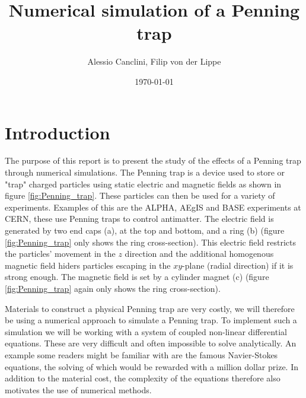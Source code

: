 \documentclass[english,notitlepage,reprint,nofootinbib]{revtex4-1}  %
\begin{document}
\title{Numerical simulation of a Penning trap}  %
\author{Alessio Canclini, Filip von der Lippe} %
\date{\today}                             %
\noaffiliation                            %

\begin{abstract}
\end{abstract}
\maketitle


\section{Introduction}
The purpose of this report is to present the study of the effects of a Penning trap through numerical simulations. The Penning trap is a device used to store or "trap" charged particles 
using static electric and magnetic fields as shown in figure \ref*{fig:Penning_trap}. These particles can then be used for a variety of experiments. Examples of this are the ALPHA, AEgIS and BASE 
experiments at CERN, these use Penning traps to control antimatter. 
The electric field is generated by two end caps (a), at the top and bottom, 
and a ring (b) (figure \ref*{fig:Penning_trap} only shows the ring cross-section).
This electric field restricts the particles' movement in the $z$ direction and the additional homogenous magnetic field 
hiders particles escaping in the $xy$-plane (radial direction) if it is strong enough. The magnetic field is set by 
a cylinder magnet (c) (figure \ref*{fig:Penning_trap} again only shows the ring cross-section). 

Materials to construct a physical Penning trap are very costly, we will therefore
be using a numerical approach to simulate a Penning trap. To implement such a simulation
we will be working with a system of coupled non-linear differential equations. These are very
difficult and often impossible to solve analytically. An example some readers might be familiar with are the famous
Navier-Stokes equations, the solving of which would be rewarded with a million dollar prize. In addition to the
material cost, the complexity of the equations therefore also motivates the use of numerical methods.
\end{document}
